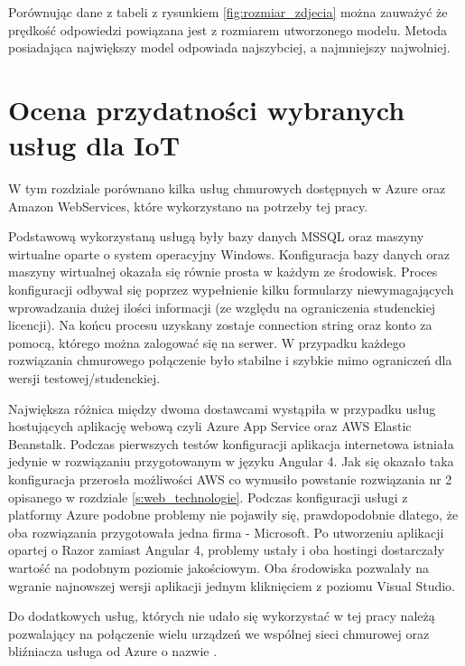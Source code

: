 Porównując dane z tabeli z rysunkiem \ref{fig:rozmiar_zdjecia} można zauważyć że prędkość odpowiedzi powiązana jest z rozmiarem utworzonego modelu. Metoda posiadająca największy model odpowiada najszybciej, a najmniejszy najwolniej.
\begin{table}[H]\label{tab:szybkosc_identyfikacji}
	\centering
	\caption{Średni czas przetwarzania zadania identyfikacji twarzy}
\end{table}

\section{Ocena przydatności wybranych usług dla IoT}
W tym rozdziale porównano kilka usług chmurowych dostępnych w Azure oraz Amazon WebServices, które wykorzystano na potrzeby tej pracy.

Podstawową wykorzystaną usługą były bazy danych MSSQL oraz maszyny wirtualne oparte o system operacyjny Windows. Konfiguracja bazy danych oraz maszyny wirtualnej okazała się równie prosta w każdym ze środowisk. Proces konfiguracji odbywał się poprzez wypełnienie kilku formularzy niewymagających wprowadzania dużej ilości informacji (ze względu na ograniczenia studenckiej licencji). Na końcu procesu uzyskany zostaje connection string oraz konto za pomocą, którego można zalogować się na serwer. W przypadku każdego rozwiązania chmurowego połączenie było stabilne i szybkie mimo ograniczeń dla wersji testowej/studenckiej.

Największa różnica między dwoma dostawcami wystąpiła w przypadku usług hostujących aplikację webową czyli Azure App Service oraz AWS Elastic Beanstalk. Podczas pierwszych testów konfiguracji aplikacja internetowa istniała jedynie w rozwiązaniu przygotowanym w języku Angular 4. Jak się okazało taka konfiguracja przerosła możliwości AWS co wymusiło powstanie rozwiązania nr 2 opisanego w rozdziale \ref{s:web_technologie}. Podczas konfiguracji usługi z platformy Azure podobne problemy nie pojawiły się, prawdopodobnie dlatego, że oba rozwiązania przygotowała jedna firma - Microsoft. Po utworzeniu aplikacji opartej o Razor zamiast Angular 4, problemy ustały i oba hostingi dostarczały wartość na podobnym poziomie jakościowym. Oba środowiska pozwalały na wgranie najnowszej wersji aplikacji jednym kliknięciem z poziomu Visual Studio.

Do dodatkowych usług, których nie udało się wykorzystać w tej pracy należą  pozwalający na połączenie wielu urządzeń we wspólnej sieci chmurowej oraz bliźniacza usługa od Azure o nazwie .